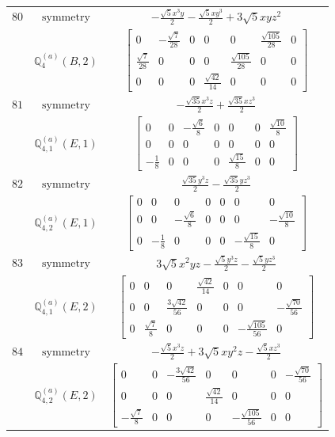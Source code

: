 \documentclass[fleqn,8pt,landscape]{jsarticle}
\begin{document}
\begin{longtable}{ccc}
$ 80 $ & $ \text{symmetry} $ & $ - \frac{\sqrt{5} x^{3} y}{2} - \frac{\sqrt{5} x y^{3}}{2} + 3 \sqrt{5} x y z^{2} $ \\
$  $ & $ \mathbb{Q}_{4}^{(a)}(B,2) $ & $ \begin{bmatrix} 0 & - \frac{\sqrt{7}}{28} & 0 & 0 & 0 & \frac{\sqrt{105}}{28} & 0 \\ \frac{\sqrt{7}}{28} & 0 & 0 & 0 & \frac{\sqrt{105}}{28} & 0 & 0 \\ 0 & 0 & 0 & \frac{\sqrt{42}}{14} & 0 & 0 & 0 \end{bmatrix} $ \\ \hline
$ 81 $ & $ \text{symmetry} $ & $ - \frac{\sqrt{35} x^{3} z}{2} + \frac{\sqrt{35} x z^{3}}{2} $ \\
$  $ & $ \mathbb{Q}_{4,1}^{(a)}(E,1) $ & $ \begin{bmatrix} 0 & 0 & - \frac{\sqrt{6}}{8} & 0 & 0 & 0 & \frac{\sqrt{10}}{8} \\ 0 & 0 & 0 & 0 & 0 & 0 & 0 \\ - \frac{1}{8} & 0 & 0 & 0 & \frac{\sqrt{15}}{8} & 0 & 0 \end{bmatrix} $ \\ \hline
$ 82 $ & $ \text{symmetry} $ & $ \frac{\sqrt{35} y^{3} z}{2} - \frac{\sqrt{35} y z^{3}}{2} $ \\
$  $ & $ \mathbb{Q}_{4,2}^{(a)}(E,1) $ & $ \begin{bmatrix} 0 & 0 & 0 & 0 & 0 & 0 & 0 \\ 0 & 0 & - \frac{\sqrt{6}}{8} & 0 & 0 & 0 & - \frac{\sqrt{10}}{8} \\ 0 & - \frac{1}{8} & 0 & 0 & 0 & - \frac{\sqrt{15}}{8} & 0 \end{bmatrix} $ \\ \hline
$ 83 $ & $ \text{symmetry} $ & $ 3 \sqrt{5} x^{2} y z - \frac{\sqrt{5} y^{3} z}{2} - \frac{\sqrt{5} y z^{3}}{2} $ \\
$  $ & $ \mathbb{Q}_{4,1}^{(a)}(E,2) $ & $ \begin{bmatrix} 0 & 0 & 0 & \frac{\sqrt{42}}{14} & 0 & 0 & 0 \\ 0 & 0 & \frac{3 \sqrt{42}}{56} & 0 & 0 & 0 & - \frac{\sqrt{70}}{56} \\ 0 & \frac{\sqrt{7}}{8} & 0 & 0 & 0 & - \frac{\sqrt{105}}{56} & 0 \end{bmatrix} $ \\ \hline
$ 84 $ & $ \text{symmetry} $ & $ - \frac{\sqrt{5} x^{3} z}{2} + 3 \sqrt{5} x y^{2} z - \frac{\sqrt{5} x z^{3}}{2} $ \\
$  $ & $ \mathbb{Q}_{4,2}^{(a)}(E,2) $ & $ \begin{bmatrix} 0 & 0 & - \frac{3 \sqrt{42}}{56} & 0 & 0 & 0 & - \frac{\sqrt{70}}{56} \\ 0 & 0 & 0 & \frac{\sqrt{42}}{14} & 0 & 0 & 0 \\ - \frac{\sqrt{7}}{8} & 0 & 0 & 0 & - \frac{\sqrt{105}}{56} & 0 & 0 \end{bmatrix} $ \\ \hline

\end{longtable}
\end{document}
